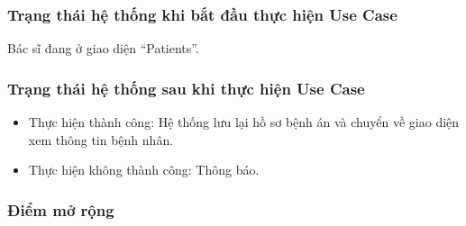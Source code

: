 \subsubsection{Trạng thái hệ thống khi bắt đầu thực hiện Use Case}
Bác sĩ đang ở giao diện ``Patients''.

\subsubsection{Trạng thái hệ thống sau khi thực hiện Use Case}
\begin{itemize}
  \item Thực hiện thành công: Hệ thống lưu lại hồ sơ bệnh án và chuyển về giao diện xem thông tin bệnh nhân.
  \item Thực hiện không thành công: Thông báo.
\end{itemize}

\subsubsection{Điểm mở rộng}
